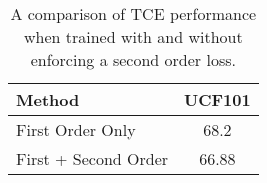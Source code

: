 \documentclass[a4paper,conference]{IEEEtran}
\begin{document}
\begin{table}[h]
    \centering
    \caption{A comparison of TCE performance when trained with and without enforcing a second order loss.}
    \begin{tabular}{lc}
        \hline \hline 
         \textbf{Method} \hspace{10mm} & \hspace{5mm}\textbf{UCF101}\hspace{5mm} \\
         \hline \hline 
         First Order Only &  68.2\\
         \hline
         First + Second Order & 66.88\\
         \hline 
    \end{tabular}
    \label{tab:ablations}
\end{table}
\end{document}
